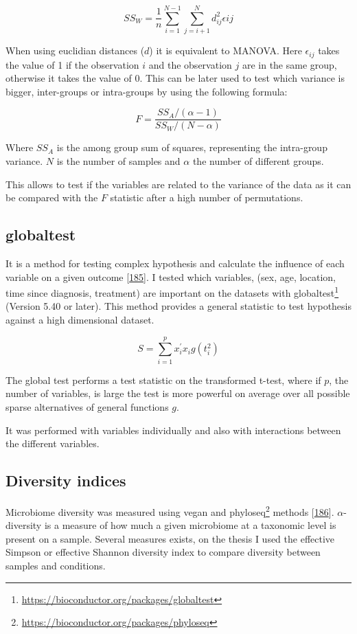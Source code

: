 \documentclass[
  12pt,
  a4paper,
  twoside,
  openright]{book}
\DeclareRobustCommand{\href}[2]{#2\footnote{\url{#1}}}
\begin{document}
\[
SS_W = \frac{1}{n} \sum_{i=1}^{N-1}\sum_{j=i+1}^N d_{ij}^2\epsilon{ij} 
\]

When using euclidian distances (\(d\)) it is equivalent to MANOVA.
Here \(\epsilon_{ij}\) takes the value of 1 if the observation \(i\) and the observation \(j\) are in the same group, otherwise it takes the value of 0.
This can be later used to test which variance is bigger, inter-groups or intra-groups by using the following formula:

\[
F = \dfrac{SS_A/(\alpha -1)}{SS_W/(N-\alpha)}
\]

Where \(SS_A\) is the among group sum of squares, representing the intra-group variance.
\(N\) is the number of samples and \(\alpha\) the number of different groups.

This allows to test if the variables are related to the variance of the data as it can be compared with the \(F\) statistic after a high number of permutations.

\hypertarget{globaltest}{%
\subsection{globaltest}\label{globaltest}}

It is a method for testing complex hypothesis and calculate the influence of each variable on a given outcome {[}\protect\hyperlink{ref-goeman2006}{185}{]}.
I tested which variables, (sex, age, location, time since diagnosis, treatment) are important on the datasets with \href{https://bioconductor.org/packages/globaltest}{globaltest} (Version 5.40 or later).
This method provides a general statistic to test hypothesis against a high dimensional dataset.

\[
S = \sum_{i=1}^p x_i^{'} x_i g(t_i^2)
\]

The global test performs a test statistic on the transformed t-test, where if \(p\), the number of variables, is large the test is more powerful on average over all possible sparse alternatives of general functions \(g\).

It was performed with variables individually and also with interactions between the different variables.

\hypertarget{diversity-indices}{%
\subsection{Diversity indices}\label{diversity-indices}}

Microbiome diversity was measured using vegan and \href{https://bioconductor.org/packages/phyloseq}{phyloseq} methods {[}\protect\hyperlink{ref-oksanen2020}{186}{]}.
\(\alpha\)-diversity is a measure of how much a given microbiome at a taxonomic level is present on a sample.
Several measures exists, on the thesis I used the effective Simpson or effective Shannon diversity index to compare diversity between samples and conditions.
\end{document}
